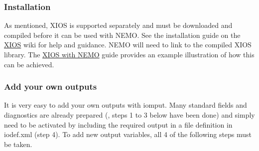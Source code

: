 \documentclass[../main/NEMO_manual]{subfiles}
\begin{document}
\subsubsection{Installation}

As mentioned, XIOS is supported separately and must be downloaded and compiled before it can be used with NEMO.
See the installation guide on the \href{http://forge.ipsl.jussieu.fr/ioserver/wiki}{XIOS} wiki for help and guidance.
NEMO will need to link to the compiled XIOS library.
The \href{https://forge.ipsl.jussieu.fr/nemo/wiki/Users/ModelInterfacing/InputsOutputs#Inputs-OutputsusingXIOS}
{XIOS with NEMO} guide provides an example illustration of how this can be achieved.

\subsubsection{Add your own outputs}

It is very easy to add your own outputs with iomput.
Many standard fields and diagnostics are already prepared (\ie, steps 1 to 3 below have been done) and
simply need to be activated by including the required output in a file definition in iodef.xml (step 4).
To add new output variables, all 4 of the following steps must be taken.
\end{document}
